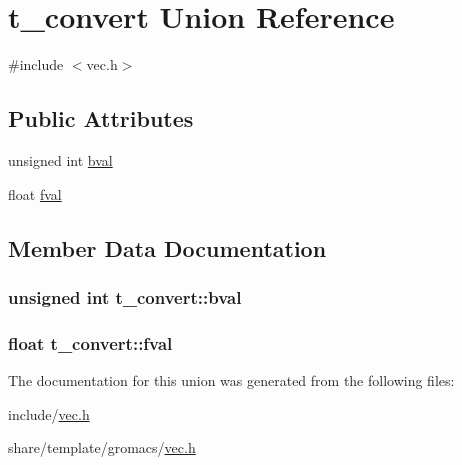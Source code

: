 \hypertarget{uniont__convert}{\section{t\-\_\-convert \-Union \-Reference}
\label{uniont__convert}
}


{\ttfamily \#include $<$vec.\-h$>$}

\subsection*{\-Public \-Attributes}
\begin{DoxyCompactItemize}
\item 
unsigned int \hyperlink{uniont__convert_a4be4c78b587192ec634e9ab3b9b224fc}{bval}
\item 
float \hyperlink{uniont__convert_a8360a6070cdcb38cc916c27a8e0a40d0}{fval}
\end{DoxyCompactItemize}


\subsection{\-Member \-Data \-Documentation}
\hypertarget{uniont__convert_a4be4c78b587192ec634e9ab3b9b224fc}{
\subsubsection[{bval}]{\setlength{\rightskip}{0pt plus 5cm}unsigned int {\bf t\-\_\-convert\-::bval}}}\label{uniont__convert_a4be4c78b587192ec634e9ab3b9b224fc}
\hypertarget{uniont__convert_a8360a6070cdcb38cc916c27a8e0a40d0}{
\subsubsection[{fval}]{\setlength{\rightskip}{0pt plus 5cm}float {\bf t\-\_\-convert\-::fval}}}\label{uniont__convert_a8360a6070cdcb38cc916c27a8e0a40d0}


\-The documentation for this union was generated from the following files\-:\begin{DoxyCompactItemize}
\item 
include/\hyperlink{include_2vec_8h}{vec.\-h}\item 
share/template/gromacs/\hyperlink{share_2template_2gromacs_2vec_8h}{vec.\-h}\end{DoxyCompactItemize}
